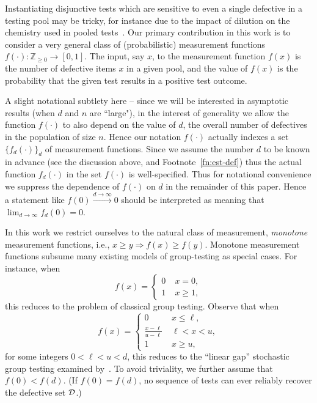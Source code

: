 \documentclass[onecolumn,letterpaper]{IEEEtran}
\newcommand{\cD}{{\cal D}}
\begin{document}
Instantiating disjunctive tests which are sensitive to even a single defective in a testing pool may be tricky, for instance due to the impact of dilution on the chemistry used in pooled tests~\cite{zenios1998pooled}. Our primary contribution in this work is  to consider a very general class of (probabilistic) measurement functions  $f(\cdot): \mathbb{Z}_{\geq 0} \rightarrow [0, 1]$. The input, say $x$, to the measurement function $f(x)$ is the number of defective items $x$ in a given pool, and the value of $f(x)$ is the probability that the given test results in a positive test outcome. 

A slight notational subtlety here -- since we will be interested in asymptotic results (when $d$ and $n$ are ``large"), in the interest of generality we allow the function $f(\cdot)$ to also depend on the value of $d$, the overall number of defectives in the population of size $n$. Hence our notation $f(\cdot)$ actually indexes a set $\{f_d(\cdot)\}_{d}$ of measurement functions. Since we assume the number $d$ to be known in advance (see the discussion above, and Footnote~\ref{fn:est-def}) thus the actual function $f_d(\cdot)$ in the set $f(\cdot)$ is well-specified. Thus for notational convenience we suppress the dependence of $f(\cdot)$ on $d$ in the remainder of this paper. Hence a statement like $f(0) \xrightarrow{d\rightarrow \infty}0$ should be interpreted as meaning that $\lim_{d \rightarrow \infty} f_d(0) = 0$.

In this work we restrict ourselves to the natural class of measurement, {\it monotone} measurement functions, i.e., $x\geq y \Rightarrow f(x)\geq f(y)$. Monotone measurement functions subsume many existing models of group-testing as special cases. For instance, when 
\begin{equation} 
\label{f(x)_classical}
    f(x)= 
    \left\{
    \begin{array}{cc}
    0& \; x = 0, \\
    1     &  \; x \geq 1,
    \end{array} 
    \right.
\end{equation}
this reduces to the problem of classical group testing. 
Observe that when 
\begin{equation} 
    f(x)= 
    \left\{
    \begin{array}{cc}
    0     & \; x \leq \ell, \\
    \frac{x-\ell}{u-\ell}     &  \; \ell < x< u,\\
    1   & \; x \geq u, 
    \end{array} \label{f(x)_linear_gap}
    \right.
\end{equation}
for some integers $0 < \ell< u < d$, this reduces to the ``linear gap'' stochastic group testing examined by~\cite{sid13itw}. To avoid triviality, we further assume that $f(0)<f(d)$. (If $f(0)=f(d)$, no sequence of tests can ever reliably recover the defective set $\cD$.)
\end{document}
